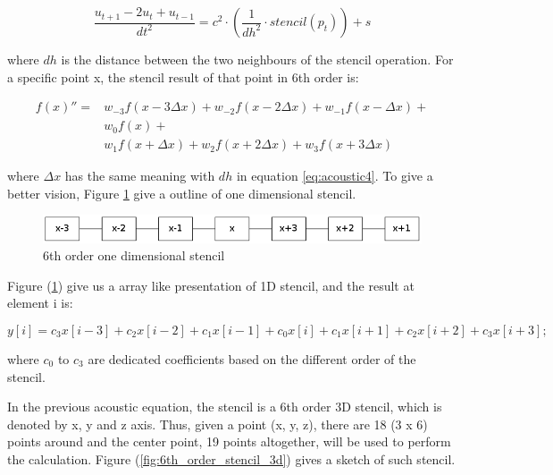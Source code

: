 \begin{equation}
  \frac{u_{t+1} - 2u_{t} + u_{t-1}}{dt^2}=
  c^2 \cdot\left( \frac{1}{dh^2} \cdot stencil\left( p_t \right) \right)
     +s
  \label{eq:acoustic4}
\end{equation}

where \( dh \) is the distance between the two neighbours of the stencil
operation. For a specific point x, the stencil result of that point in 6th
order is:

\begin{equation}
  \begin{split}
    {f(x)}'' =
    & w_{-3}f\left( x - 3 \Delta x \right) +
      w_{-2}f\left( x - 2 \Delta x \right) +
      w_{-1}f\left( x - \Delta x   \right) + \\
    & w_{0}f\left( x \right) + \\
    & w_{1}f\left( x + \Delta x \right) +
      w_{2}f\left( x + 2 \Delta x \right) +
      w_{3}f\left( x + 3 \Delta x \right)
  \end{split}
\end{equation}

where \( \Delta x \) has the same meaning with \( dh \) in equation
\ref{eq:acoustic4}. To give a better vision, Figure
\ref{fig:6th_order_stencil_1d} give a outline of one dimensional stencil.

\begin{figure}[h]
  \centering
  \includegraphics[scale=0.4]{img/6th_order_stencil.png}
  \caption{6th order one dimensional stencil}
  \label{fig:6th_order_stencil_1d}
\end{figure}

Figure (\ref{fig:6th_order_stencil_1d}) give us a array like presentation of
1D stencil, and the result at element i is:

\[
  y\left[ i \right] = c_3  x\left[ i-3 \right] +
                      c_2  x\left[ i-2 \right] +
                      c_1  x\left[ i-1 \right] +
                      c_0  x\left[ i \right] +
                      c_1  x\left[ i+1 \right] +
                      c_2  x\left[ i+2 \right] +
                      c_3  x\left[ i+3 \right];
\]

where \( c_0 \) to \( c_3 \) are dedicated coefficients based on the
different order of the stencil.

In the previous acoustic equation, the stencil is a 6th order 3D stencil,
which is denoted by x, y and z axis. Thus, given a point (x, y, z), there
are 18 (3 x 6) points around and the center point, 19 points altogether,
will be used to perform the calculation. Figure
(\ref{fig:6th_order_stencil_3d}) gives a sketch of such stencil.

